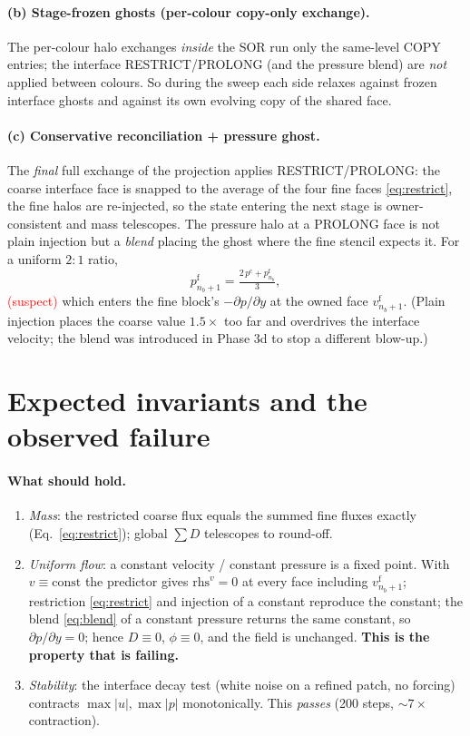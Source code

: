 \documentclass[11pt]{article}
\newcommand{\fine}{\mathrm{f}}
\newcommand{\coarse}{\mathrm{c}}
\begin{document}
\paragraph{(b) Stage-frozen ghosts (per-colour copy-only exchange).}
The per-colour halo exchanges \emph{inside} the SOR run only the same-level
COPY entries; the interface RESTRICT/PROLONG (and the pressure blend) are
\emph{not} applied between colours. So during the sweep each side relaxes
against frozen interface ghosts and against its own evolving copy of the
shared face.

\paragraph{(c) Conservative reconciliation + pressure ghost.}
The \emph{final} full exchange of the projection applies RESTRICT/PROLONG:
the coarse interface face is snapped to the average of the four fine faces
\eqref{eq:restrict}, the fine halos are re-injected, so the state entering the
next stage is owner-consistent and mass telescopes. The pressure halo at a
PROLONG face is not plain injection but a \emph{blend} placing the ghost where
the fine stencil expects it. For a uniform $2{:}1$ ratio,
\begin{equation}
  p^\fine_{n_b+1}=\tfrac{2\,p^\coarse+p^\fine_{n_b}}{3},
  \label{eq:blend}
\end{equation}
\textcolor{red}{(suspect)} which enters the fine block's
$-\partial p/\partial y$ at the owned face $v^\fine_{n_b+1}$. (Plain injection
places the coarse value $1.5\times$ too far and overdrives the interface
velocity; the blend was introduced in Phase 3d to stop a different blow-up.)

\section{Expected invariants and the observed failure}

\paragraph{What should hold.}
\begin{enumerate}
\item \emph{Mass}: the restricted coarse flux equals the summed fine fluxes
  exactly (Eq.~\ref{eq:restrict}); global $\sum D$ telescopes to round-off.
\item \emph{Uniform flow}: a constant velocity / constant pressure is a fixed
  point. With $v\equiv\text{const}$ the predictor gives $\mathrm{rhs}^v=0$ at
  every face including $v^\fine_{n_b+1}$; restriction \eqref{eq:restrict} and
  injection of a constant reproduce the constant; the blend
  \eqref{eq:blend} of a constant pressure returns the same constant, so
  $\partial p/\partial y=0$; hence $D\equiv0$, $\phi\equiv0$, and the field is
  unchanged. \textbf{This is the property that is failing.}
\item \emph{Stability}: the interface decay test (white noise on a refined
  patch, no forcing) contracts $\max|u|,\max|p|$ monotonically. This
  \emph{passes} (200 steps, $\sim\!7\times$ contraction).
\end{enumerate}
\end{document}
